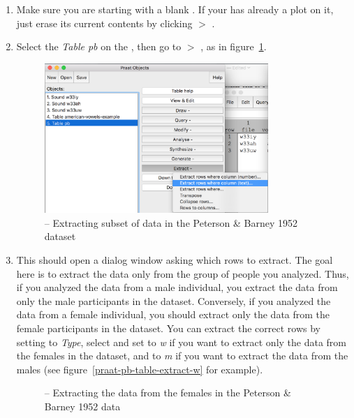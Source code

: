 \begin{enumerate}
\item Make sure you are starting with a blank . If your  has already a plot on it, just erase its current contents by clicking  $>$ .
%
\item Select the \emph{Table pb} on the , then go to  $>$ , as in figure~\ref{praat-pb-table-extraction}.
%
\begin{figure}[!tbp]
\caption{\Praat{} -- Extracting subset of data in the Peterson \& Barney 1952 dataset}
\label{praat-pb-table-extraction}
	\begin{center}
		\includegraphics[width=0.8\textwidth]{./figures/Praat-20-Extract-rows-pb}
	\end{center}
\end{figure}
%
\item This should open a dialog window asking which rows to extract. The goal here is to extract the data only from the group of people you analyzed. Thus, if you analyzed the data from a male individual, you extract the data from only the male participants in the dataset. Conversely, if you analyzed the data from a female individual, you should extract only the data from the female participants in the dataset. You can extract the correct rows by setting  to \emph{Type}, select  and set  to \emph{w} if you want to extract only the data from the females in the dataset, and to \emph{m} if you want to extract the data from the males (see figure~\ref{praat-pb-table-extract-w} for example).
%
\begin{figure}[!tbp]
\caption{\Praat{} -- Extracting the data from the females in the Peterson \& Barney 1952 data}

\end{figure}
\end{enumerate}
